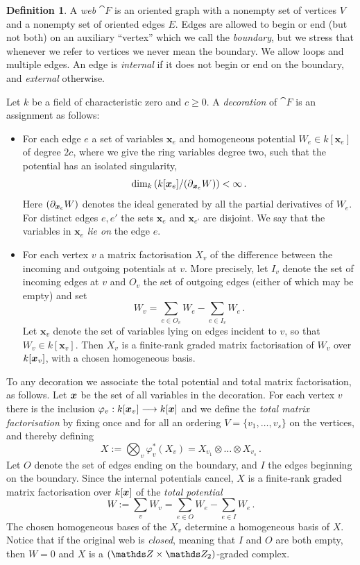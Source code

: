 \documentclass{compositio}
\theoremstyle{definition}
\newtheorem{definition}[theorem]{Definition}
\numberwithin{equation}{section}
\begin{document}
\begin{definition}\label{defwebs}
A \emph{web} $\cat{F}$ is an oriented graph with a nonempty set of vertices $V$ and a nonempty set of oriented edges $E$. Edges are allowed to begin or end (but not both) on an auxiliary ``vertex'' which we call the \emph{boundary}, but we stress that whenever we refer to vertices we never mean the boundary. We allow loops and multiple edges. An edge is \emph{internal} if it does not begin or end on the boundary, and \emph{external} otherwise. 

Let $k$ be a field of characteristic zero and $c \ge 0$. A \emph{decoration} of $\cat{F}$ is an assignment as follows:
\begin{itemize}
\item For each edge $e$ a set of variables $\boldsymbol{x}_e$ and homogeneous potential $W_e \in k[\boldsymbol{x}_e]$ of degree $2c$, where we give the ring variables degree two, such that the potential has an isolated singularity, 
\[
\dim_k\left( k[\boldsymbol{x}_e]/(\partial_{\boldsymbol{x}_e} W) \right) < \infty \, .
\]
Here $(\partial_{\boldsymbol{x}_e} W)$ denotes the ideal generated by all the partial derivatives of $W_e$. For distinct edges $e,e'$ the sets $\boldsymbol{x}_e$ and $\boldsymbol{x}_{e'}$ are disjoint. We say that the variables in $\boldsymbol{x}_e$ \emph{lie on} the edge $e$.
\item For each vertex $v$ a matrix factorisation $X_v$ of the difference between the incoming and outgoing potentials at $v$. More precisely, let $I_v$ denote the set of incoming edges at $v$ and $O_v$ the set of outgoing edges (either of which may be empty) and set
\[
W_v = \sum_{e \in O_v} W_e - \sum_{e \in I_v} W_e \, .
\]
Let $\boldsymbol{x}_v$ denote the set of variables lying on edges incident to $v$, so that $W_v \in k[\boldsymbol{x}_v]$. Then $X_v$ is a finite-rank graded matrix factorisation of $W_v$ over $k[\boldsymbol{x}_v]$, with a chosen homogeneous basis.
\end{itemize}
To any decoration we associate the total potential and total matrix factorisation, as follows. Let $\boldsymbol{x}$ be the set of all variables in the decoration. For each vertex $v$ there is the inclusion $\varphi_v: k[\boldsymbol{x}_v] \longrightarrow k[\boldsymbol{x}]$ and we define the \emph{total matrix factorisation} by fixing once and for all an ordering $V = \{ v_1, \ldots, v_s \}$ on the vertices, and thereby defining
\[
X := \bigotimes_v \varphi_v^*(X_v) = X_{v_1} \otimes \ldots \otimes X_{v_s}\,.
\]
Let $O$ denote the set of edges ending on the boundary, and $I$ the edges beginning on the boundary. Since the internal potentials cancel, $X$ is a finite-rank graded matrix factorisation over $k[\boldsymbol{x}]$ of the \emph{total potential}
\[
W := \sum_v W_v = \sum_{e \in O} W_e - \sum_{e \in I} W_e\,.
\]
The chosen homogeneous bases of the $X_v$ determine a homogeneous basis of $X$. Notice that if the original web is \emph{closed}, meaning that $I$ and $O$ are both empty, then $W = 0$ and $X$ is a $(\ZZ \times \Ztwo)$-graded complex.
\end{definition}
\end{document}
